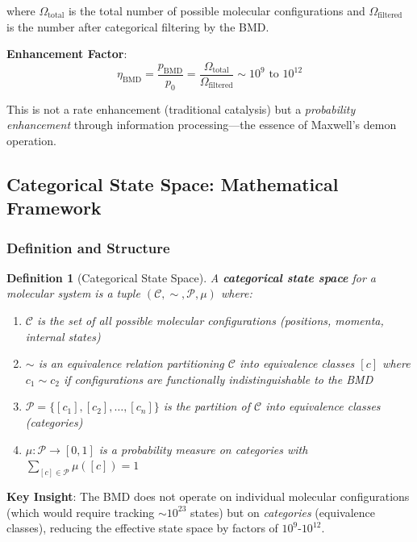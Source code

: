 \documentclass[11pt,a4paper]{article}
\newtheorem{definition}{Definition}[section]
\begin{document}
where $\Omega_{\text{total}}$ is the total number of possible molecular configurations and $\Omega_{\text{filtered}}$ is the number after categorical filtering by the BMD.

\textbf{Enhancement Factor}:
\begin{equation}
\eta_{\text{BMD}} = \frac{p_{\text{BMD}}}{p_0} = \frac{\Omega_{\text{total}}}{\Omega_{\text{filtered}}} \sim 10^{9} \text{ to } 10^{12}
\end{equation}

This is not a rate enhancement (traditional catalysis) but a \textit{probability enhancement} through information processing—the essence of Maxwell's demon operation.

\subsection{Categorical State Space: Mathematical Framework}

\subsubsection{Definition and Structure}

\begin{definition}[Categorical State Space]
\label{def:categorical_space}
A \textbf{categorical state space} for a molecular system is a tuple $(\mathcal{C}, \sim, \mathcal{P}, \mu)$ where:
\begin{enumerate}
\item $\mathcal{C}$ is the set of all possible molecular configurations (positions, momenta, internal states)
\item $\sim$ is an equivalence relation partitioning $\mathcal{C}$ into equivalence classes $[c]$ where $c_1 \sim c_2$ if configurations are functionally indistinguishable to the BMD
\item $\mathcal{P} = \{[c_1], [c_2], \ldots, [c_n]\}$ is the partition of $\mathcal{C}$ into equivalence classes (categories)
\item $\mu: \mathcal{P} \to [0,1]$ is a probability measure on categories with $\sum_{[c] \in \mathcal{P}} \mu([c]) = 1$
\end{enumerate}
\end{definition}

\textbf{Key Insight}: The BMD does not operate on individual molecular configurations (which would require tracking $\sim 10^{23}$ states) but on \textit{categories} (equivalence classes), reducing the effective state space by factors of $10^{9}$-$10^{12}$.
\end{document}
